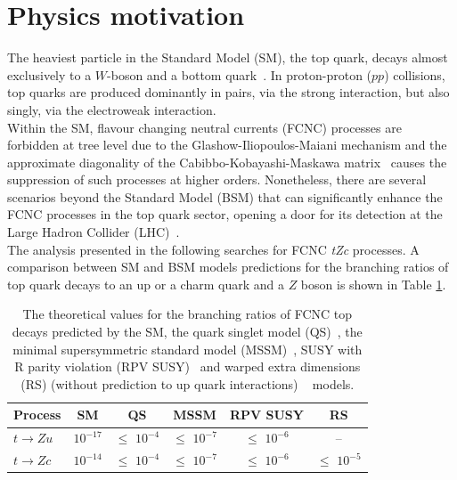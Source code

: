 \section{Physics motivation}
The heaviest particle in the Standard Model (SM), the top quark, decays almost exclusively to a $W$-boson and a bottom quark~\cite{pdg2}. In proton-proton ($pp$) collisions, top quarks are produced dominantly in pairs, via the strong interaction, but also singly, via the electroweak interaction. \\%
Within the SM, flavour changing neutral currents (FCNC) processes are forbidden at tree level due to the Glashow-Iliopoulos-Maiani mechanism \cite{gim} and the approximate diagonality of the Cabibbo-Kobayashi-Maskawa matrix~\cite{pdg2} causes the suppression of such processes at higher orders. Nonetheless, there are several scenarios beyond the Standard Model (BSM) that can significantly enhance the FCNC processes in the top quark sector, opening a door for its detection at the Large Hadron Collider (LHC)~\cite{aguilar,barger,h2dm_limit,mssm_limit,RPV_limit, extra_limit}. \\
The analysis presented in the following searches for FCNC \textit{tZc} processes. A comparison between SM and BSM models predictions for the branching ratios of top quark decays to an up or a charm quark and a $Z$ boson is shown in Table \ref{tab:intro-fcnc-br-th}.\\

\begin{table}[h]
	\caption{The theoretical values for the branching ratios of FCNC top decays
		predicted by the SM, the quark singlet model (QS)~\cite{aguilar},
		the minimal supersymmetric standard model (MSSM)~\cite{mssm_limit}, SUSY with R parity violation
		(RPV SUSY)~\cite{RPV_limit} and warped extra dimensions (RS) (without prediction to up quark interactions) ~\cite{extra_limit} models.}
	\label{tab:intro-fcnc-br-th}
	\centering
	\begin{tabular}{l c c c c c}
		\toprule
		\textbf{Process} & SM & QS & MSSM & RPV SUSY & RS \\
		\midrule
		$t\to Zu$ & $10^{-17}$ & $\leq$ $10^{-4}$
		& $\leq$ $10^{-7}$
		& $\leq$ $10^{-6}$ & --\\
		$t\to Zc$ & $10^{-14}$ & $\leq$ $10^{-4}$
		& $\leq$ $10^{-7}$
		& $\leq$ $10^{-6}$ & $\leq$ $10^{-5}$\\
		\bottomrule
	\end{tabular}
\end{table}

